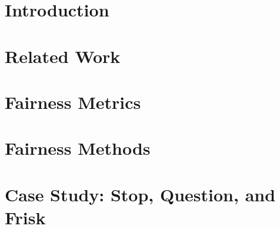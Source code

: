 \documentclass[12pt]{article}
\begin{document}
\newpage
\tableofcontents
\newpage



    
\section{Introduction}
% 
\section{Related Work}
\section{Fairness Metrics}

\section{Fairness Methods}

\section{Case Study: Stop, Question, and Frisk}



\newpage

% 

% 
\newpage



\listoffigures
% 

\newpage

\end{document}
